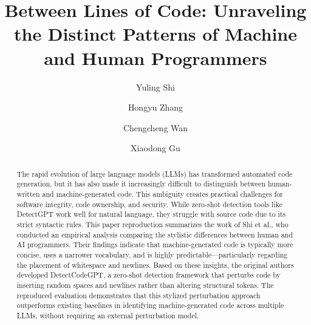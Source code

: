 \documentclass[manuscript,review]{acmart}
\begin{document}
\title{Between Lines of Code: Unraveling the Distinct Patterns of Machine and Human Programmers}

\author{Yuling Shi}

\author{Hongyu Zhang}

\author{Chengcheng Wan}

\author{Xiaodong Gu}



\begin{abstract}

The rapid evolution of large language models (LLMs) has transformed automated code generation, but it has also made it increasingly difficult to distinguish between human-written and machine-generated code. This ambiguity creates practical challenges for software integrity, code ownership, and security. While zero-shot detection tools like DetectGPT work well for natural language, they struggle with source code due to its strict syntactic rules. This paper reproduction summarizes the work of Shi et al., who conducted an empirical analysis comparing the stylistic differences between human and AI programmers. Their findings indicate that machine-generated code is typically more concise, uses a narrower vocabulary, and is highly predictable—particularly regarding the placement of whitespace and newlines. Based on these insights, the original authors developed DetectCodeGPT, a zero-shot detection framework that perturbs code by inserting random spaces and newlines rather than altering structural tokens. The reproduced evaluation demonstrates that this stylized perturbation approach outperforms existing baselines in identifying machine-generated code across multiple LLMs, without requiring an external perturbation model.

\end{abstract}

\maketitle
\end{document}
